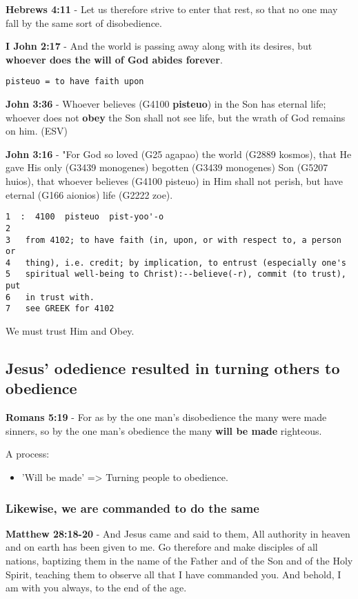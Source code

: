 \documentclass[11pt]{article}
\begin{document}
\textbf{Hebrews 4:11} - Let us therefore strive to enter that rest, so that no one may fall by the same sort of disobedience.

\textbf{I John 2:17} - And the world is passing away along with its desires, but \textbf{whoever does the will of God abides forever}.

\texttt{pisteuo = to have faith upon}

\textbf{John 3:36} - Whoever believes (G4100 \textbf{pisteuo}) in the Son has eternal life; whoever does not \textbf{obey} the Son shall not see life, but the wrath of God remains on him. (ESV)

\textbf{John 3:16} - "For God so loved (G25 agapao) the world (G2889 kosmos), that He gave His only (G3439 monogenes) begotten (G3439 monogenes) Son (G5207 huios), that whoever believes (G4100 pisteuo) in Him shall not perish, but have eternal (G166 aionios) life (G2222 zoe).

\begin{verbatim}
1  :  4100  pisteuo  pist-yoo'-o
2  
3   from 4102; to have faith (in, upon, or with respect to, a person or
4   thing), i.e. credit; by implication, to entrust (especially one's
5   spiritual well-being to Christ):--believe(-r), commit (to trust), put
6   in trust with.
7   see GREEK for 4102
\end{verbatim}

We must trust Him and Obey.

\subsection{Jesus' odedience resulted in turning others to obedience}
\label{sec:org7e0623c}
\textbf{Romans 5:19} - For as by the one man's disobedience the many were made sinners, so by the one man's obedience the many \textbf{will be made} righteous.

A process:
\begin{itemize}
\item 'Will be made' => Turning people to obedience.
\end{itemize}

\subsubsection{Likewise, we are commanded to do the same}
\label{sec:org605f997}
\textbf{Matthew 28:18-20} - And Jesus came and said to them, All authority in heaven and on earth has been given to me. Go therefore and make disciples of all nations, baptizing them in the name of the Father and of the Son and of the Holy Spirit, teaching them to observe all that I have commanded you. And behold, I am with you always, to the end of the age.
\end{document}
